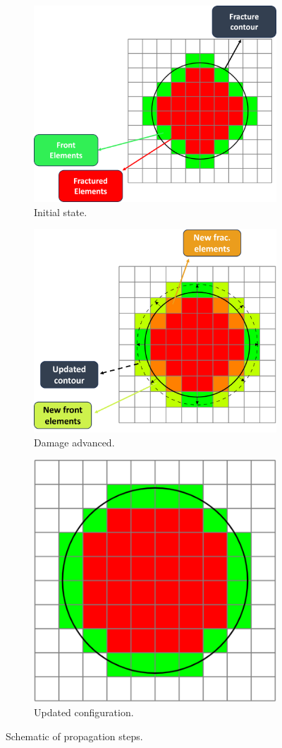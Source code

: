 \begin{figure}[h]
    \begin{subfigure}{\textwidth}
        \hspace*{1.85cm}\includegraphics[width=0.55\linewidth]{Chapter4/figures/penny_with_descriptions.png}
        \caption{Initial state.}
        \label{fig:lorem1}
    \end{subfigure}

    \begin{subfigure}{\textwidth}    
        \hspace*{2.35cm}\includegraphics[width=0.51\linewidth]{Chapter4/figures/larger_penny_with_descriptions.png}
        \caption{Damage advanced.}
        \label{fig:lorem2}
    \end{subfigure}
    
    \begin{subfigure}{\textwidth}
        \centering
        \includegraphics[width=0.33\linewidth]{Chapter4/figures/larger_penny.png}
        \caption{Updated configuration.}
        \label{fig:lorem3}
    \end{subfigure}
    \caption{Schematic of propagation steps.}
\end{figure}

